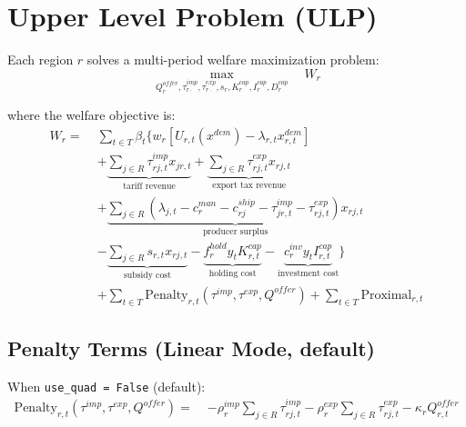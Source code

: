 \section{Upper Level Problem (ULP)}

Each region $r$ solves a multi-period welfare maximization problem:
\begin{equation}
\max_{Q^{offer}_r, \tau^{imp}_{r \cdot}, \tau^{exp}_{r \cdot}, s_r, K^{cap}_r, I^{cap}_r, D^{cap}_r} \quad W_r
\end{equation}

\noindent where the welfare objective is:
\begin{align}
W_r = \; & \sum_{t \in T} \beta_t \Bigg\{ w_r \left[ U_{r,t}(x^{dem}) - \lambda_{r,t} x^{dem}_{r,t} \right] \nonumber \\
& + \underbrace{\sum_{j \in R} \tau^{imp}_{rj,t} x_{jr,t}}_{\text{tariff revenue}}
  + \underbrace{\sum_{j \in R} \tau^{exp}_{rj,t} x_{rj,t}}_{\text{export tax revenue}} \nonumber \\
& + \underbrace{\sum_{j \in R} \left( \lambda_{j,t} - c^{man}_r - c^{ship}_{rj} - \tau^{imp}_{jr,t} - \tau^{exp}_{rj,t} \right) x_{rj,t}}_{\text{producer surplus}} \nonumber \\
& - \underbrace{\sum_{j \in R} s_{r,t} x_{rj,t}}_{\text{subsidy cost}}
  - \underbrace{f^{hold}_r y_t K^{cap}_{r,t}}_{\text{holding cost}}
  - \underbrace{c^{inv}_r y_t I^{cap}_{r,t}}_{\text{investment cost}} \Bigg\} \nonumber \\
& + \sum_{t \in T} \text{Penalty}_{r,t}(\tau^{imp}, \tau^{exp}, Q^{offer}) + \sum_{t \in T} \text{Proximal}_{r,t}
\end{align}

\subsection{Penalty Terms (Linear Mode, default)}

When \texttt{use\_quad = False} (default):
\begin{align}
\text{Penalty}_{r,t}(\tau^{imp}, \tau^{exp}, Q^{offer}) = \;
& - \rho^{imp}_r \sum_{j \in R} \tau^{imp}_{rj,t}
  - \rho^{exp}_r \sum_{j \in R} \tau^{exp}_{rj,t}
  - \kappa_r Q^{offer}_{r,t}
\end{align}

